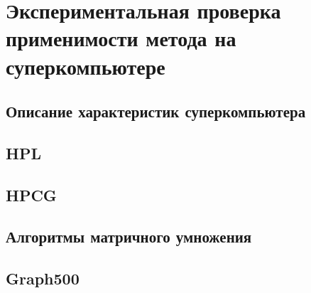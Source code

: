 \chapter{Экспериментальная проверка применимости метода на суперкомпьютере}
	\section{Описание характеристик суперкомпьютера}
	\section{HPL}
	\section{HPCG}
	\section{Алгоритмы матричного умножения}
	\section{Graph500}
\clearpage